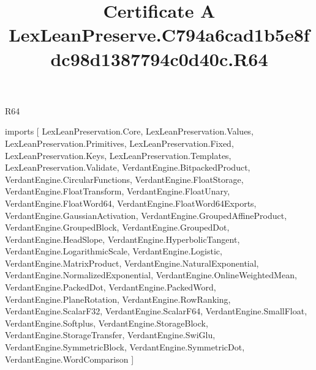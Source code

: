 \begin{lexlean}{R64}
\title{Certificate A LexLeanPreserve.C794a6cad1b5e8fdc98d1387794c0d40c.R64}
\begin{coremodule}
imports [
  LexLeanPreservation.Core,
  LexLeanPreservation.Values,
  LexLeanPreservation.Primitives,
  LexLeanPreservation.Fixed,
  LexLeanPreservation.Keys,
  LexLeanPreservation.Templates,
  LexLeanPreservation.Validate,
  VerdantEngine.BitpackedProduct,
  VerdantEngine.CircularFunctions,
  VerdantEngine.FloatStorage,
  VerdantEngine.FloatTransform,
  VerdantEngine.FloatUnary,
  VerdantEngine.FloatWord64,
  VerdantEngine.FloatWord64Exports,
  VerdantEngine.GaussianActivation,
  VerdantEngine.GroupedAffineProduct,
  VerdantEngine.GroupedBlock,
  VerdantEngine.GroupedDot,
  VerdantEngine.HeadSlope,
  VerdantEngine.HyperbolicTangent,
  VerdantEngine.LogarithmicScale,
  VerdantEngine.Logistic,
  VerdantEngine.MatrixProduct,
  VerdantEngine.NaturalExponential,
  VerdantEngine.NormalizedExponential,
  VerdantEngine.OnlineWeightedMean,
  VerdantEngine.PackedDot,
  VerdantEngine.PackedWord,
  VerdantEngine.PlaneRotation,
  VerdantEngine.RowRanking,
  VerdantEngine.ScalarF32,
  VerdantEngine.ScalarF64,
  VerdantEngine.SmallFloat,
  VerdantEngine.Softplus,
  VerdantEngine.StorageBlock,
  VerdantEngine.StorageTransfer,
  VerdantEngine.SwiGlu,
  VerdantEngine.SymmetricBlock,
  VerdantEngine.SymmetricDot,
  VerdantEngine.WordComparison
]


\end{coremodule}
\end{lexlean}

